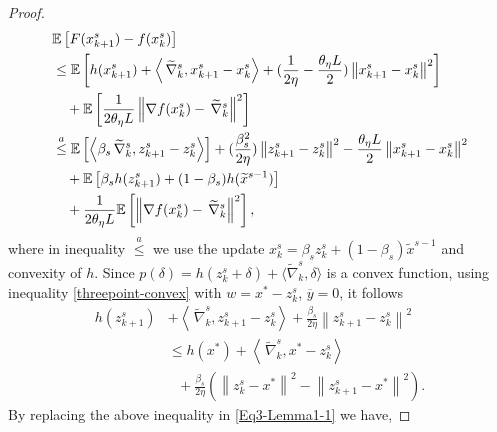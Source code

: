 \documentclass{article}
\newcommand*{\E}{\mathbb{E}}
\newcommand*{\VRG}{\,\widetilde{\nabla}_k^s}
\newcommand{\norm}[1]{\left\lVert#1\right\rVert}
\newcommand{\Iprod}[2]{\left\langle #1,#2\right\rangle}
\theoremstyle{definition}
\theoremstyle{remark}
\begin{document}
\begin{proof}
\begin{gather}\label{Eq3-Lemma1-1}
\begin{split}
&\E \left[ F(x_{k+1}^s) -f(x_{k}^s)\right]\\
&\leq \E\left[h(x_{k+1}^s)+ \Iprod{\VRG}{x_{k+1}^s-x_{k}^s}+{(\frac{1}{2\eta}-\frac{\theta_{\eta} L}{2})}\norm{x_{k+1}^s-x_{k}^s}^2\right]\\
&~~~+\E\left[\frac{1}{2\theta_{\eta} L}\norm{\nabla f(x_{k}^s)-\VRG}^2\right]\\
&\stackrel{a}{\leq}\E\left[\Iprod{\beta_s\VRG}{z_{k+1}^s-z_{k}^s}\right]+{{(\frac{{ \beta_s^2}}{2\eta})}}\norm{z_{k+1}^s-z_{k}^s}^2-\frac{\theta_{\eta} L}{2}\norm{x_{k+1}^s-x_{k}^s}^2\\
&~~~+\E\left[\beta_s h(z_{k+1}^s)+(1-\beta_s) h(\widetilde{x}^{s-1})\right]\\
&~~~+\frac{1}{2\theta_{\eta} L}\E\left[\norm{\nabla f(x_{k}^s)-\VRG}^2\right],
\end{split}
\raisetag{15pt}
\end{gather}
where in inequality $\stackrel{a}{\leq}$ we use the update $x_k^s = \beta_s z_k^s+(1-\beta_s)\widetilde{x}^{s-1}$ and convexity of $h$. Since   $p(\delta) = h(z_k^s+\delta)+\langle\widetilde{\nabla}_k^s,\delta\rangle$ is a convex function, using inequality \eqref{threepoint-convex} with $w=x^*-z_{k}^s$, $\overline{y} = 0$, it follows
\begin{equation}
\begin{split}
h(z_{k+1}^s) &+ \Iprod{\VRG}{z_{k+1}^s-z_{k}^s}+{\frac{\beta_s}{2\eta}}\norm{z_{k+1}^s-z_{k}^s}^2  \\
&\leq h(x^*)+\Iprod{\VRG}{x^* - z_{k}^s}\\
&~~~+{\frac{\beta_s}{2\eta}}(\norm{z_{k}^s-x^*}^2-\norm{z_{k+1}^s-x^*}^2).  
\end{split}
\end{equation}
By replacing the above inequality in \eqref{Eq3-Lemma1-1} we have,


\end{proof}
\end{document}
